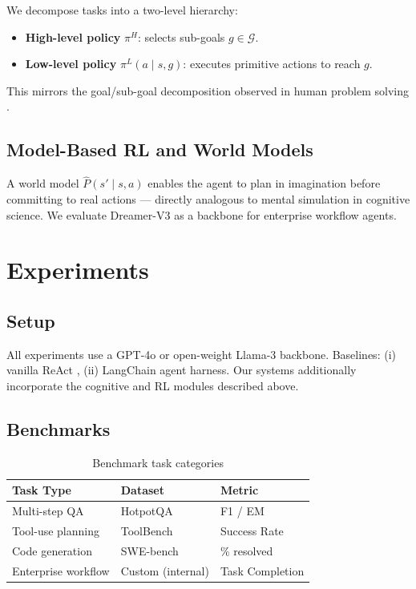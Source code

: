 \documentclass[12pt,a4paper]{article}
\begin{document}
We decompose tasks into a two-level hierarchy:
\begin{itemize}[noitemsep]
  \item \textbf{High-level policy} $\pi^H$: selects sub-goals $g \in \mathcal{G}$.
  \item \textbf{Low-level policy} $\pi^L(a \mid s, g)$: executes primitive actions to reach $g$.
\end{itemize}
This mirrors the goal/sub-goal decomposition observed in human problem solving \citep{miller1960plans}.

\subsection{Model-Based RL and World Models}

A world model $\hat{P}(s' \mid s, a)$ enables the agent to plan in imagination before
committing to real actions — directly analogous to mental simulation in cognitive science.
We evaluate Dreamer-V3 \citep{hafner2023mastering} as a backbone for enterprise workflow agents.

\section{Experiments}

\subsection{Setup}

All experiments use a GPT-4o or open-weight Llama-3 backbone.
Baselines: (i) vanilla ReAct \citep{yao2023react}, (ii) LangChain agent harness.
Our systems additionally incorporate the cognitive and RL modules described above.

\subsection{Benchmarks}

\begin{table}[h!]
\centering
\caption{Benchmark task categories}
\begin{tabular}{@{}lll@{}}
\toprule
\textbf{Task Type} & \textbf{Dataset} & \textbf{Metric} \\
\midrule
Multi-step QA        & HotpotQA                   & F1 / EM \\
Tool-use planning    & ToolBench                  & Success Rate \\
Code generation      & SWE-bench                  & \% resolved \\
Enterprise workflow  & Custom (internal)          & Task Completion \\
\bottomrule
\end{tabular}
\end{table}
\end{document}
